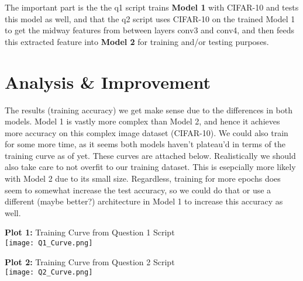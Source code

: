 \documentclass[]{report}
\begin{document}
The important part is the the q1 script trains \textbf{Model 1} with CIFAR-10 and tests this model as well, and that the q2 script uses CIFAR-10 on the trained Model 1 to get the midway features from between layers conv3 and conv4, and then feeds this extracted feature into \textbf{Model 2} for training and/or testing purposes.

\section*{Analysis \& Improvement}
The results (training accuracy) we get make sense due to the differences in both models. Model 1 is vastly more complex than Model 2, and hence it achieves more accuracy on this complex image dataset (CIFAR-10). We could also train for some more time, as it seems both models haven't plateau'd in terms of the training curve as of yet. These curves are attached below. Realistically we should also take care to not overfit to our training dataset. This is esepcially more likely with Model 2 due to its small size. Regardless, training for more epochs does seem to somewhat increase the test accuracy, so we could do that or use a different (maybe better?) architecture in Model 1 to increase this accuracy as well. \newpage

\begin{center}
	\centering
	\textbf{Plot 1:} Training Curve from Question 1 Script \\
	\texttt{[image: Q1\_Curve.png]}
\end{center}

\begin{center}
	\centering
	\textbf{Plot 2:} Training Curve from Question 2 Script \\
	\texttt{[image: Q2\_Curve.png]}
\end{center}
\end{document}
